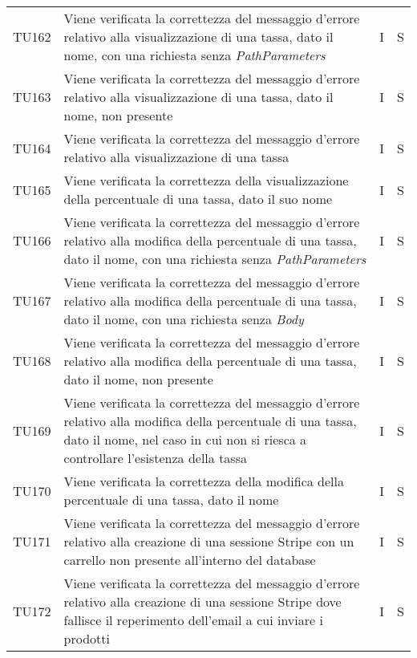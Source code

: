{\begin{longtable}{C{2cm} C{9.6cm} C{1.5cm} C{1cm}}
TU162 & Viene verificata la correttezza del messaggio d'errore relativo alla visualizzazione di una tassa, dato il nome, con una richiesta senza \textit{PathParameters}& I & S\\

TU163 & Viene verificata la correttezza del messaggio d'errore relativo alla visualizzazione di una tassa, dato il nome, non presente & I & S\\

TU164 & Viene verificata la correttezza del messaggio d'errore relativo alla visualizzazione di una tassa & I & S\\

TU165 & Viene verificata la correttezza della visualizzazione della percentuale di una tassa, dato il suo nome & I & S\\

TU166 & Viene verificata la correttezza del messaggio d'errore relativo alla modifica della percentuale di una tassa, dato il nome, con una richiesta senza \textit{PathParameters}& I & S\\

TU167 & Viene verificata la correttezza del messaggio d'errore relativo alla modifica della percentuale di una tassa, dato il nome, con una richiesta senza \textit{Body}& I & S\\

TU168 & Viene verificata la correttezza del messaggio d'errore relativo alla modifica della percentuale di una tassa, dato il nome, non presente & I & S\\

TU169 & Viene verificata la correttezza del messaggio d'errore relativo alla modifica della percentuale di una tassa, dato il nome, nel caso in cui non si riesca a controllare l'esistenza della tassa & I & S\\

TU170 & Viene verificata la correttezza della modifica della percentuale di una tassa, dato il nome & I & S\\

TU171 & Viene verificata la correttezza del messaggio d'errore relativo alla creazione di una sessione Stripe con un carrello non presente all'interno del database & I & S\\

TU172 & Viene verificata la correttezza del messaggio d'errore relativo alla creazione di una sessione Stripe dove fallisce il reperimento dell'email a cui inviare i prodotti & I & S\\


\end{longtable}}
